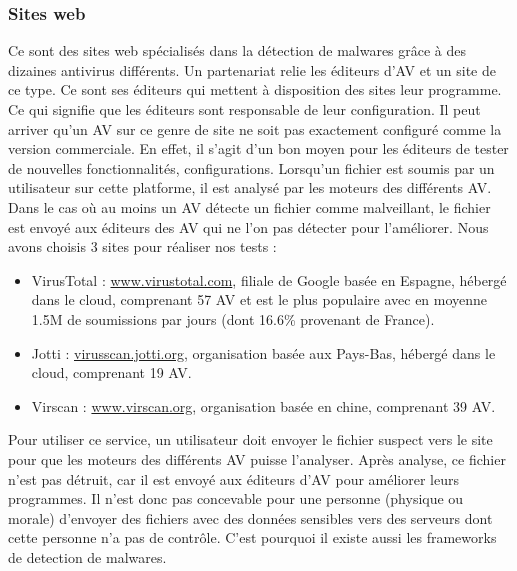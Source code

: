 \documentclass[smallextended]{svjour3}       %
\begin{document}
\subsubsection{Sites web}
\label{2.2.1sites}
Ce sont des sites web spécialisés dans la détection de malwares grâce à des dizaines antivirus différents. Un partenariat relie les éditeurs d'AV et un site de ce type. Ce sont ses éditeurs qui mettent à disposition des sites leur programme. Ce qui signifie que les éditeurs sont responsable de leur configuration. Il peut arriver qu'un AV sur ce genre de site ne soit pas exactement configuré comme la version commerciale. En effet, il s'agit d'un bon moyen pour les éditeurs de tester de nouvelles fonctionnalités, configurations. Lorsqu'un fichier est soumis par un utilisateur sur cette platforme, il est analysé par les moteurs des différents AV. Dans le cas où au moins un AV détecte un fichier comme malveillant, le fichier est envoyé aux éditeurs des AV qui ne l'on pas détecter pour l'améliorer. Nous avons choisis 3 sites pour réaliser nos tests :
\begin{itemize}
\item VirusTotal : \url{www.virustotal.com}, filiale de Google basée en Espagne, hébergé dans le cloud, comprenant 57 AV et est le plus populaire avec en moyenne 1.5M de soumissions par jours (dont 16.6\% provenant de France).
\item Jotti : \url{virusscan.jotti.org}, organisation basée aux Pays-Bas, hébergé dans le cloud, comprenant 19 AV.
\item Virscan : \url{www.virscan.org}, organisation basée en chine, comprenant 39 AV.
\end{itemize}

Pour utiliser ce service, un utilisateur doit envoyer le fichier suspect vers le site pour que les moteurs des différents AV puisse l'analyser. Après analyse, ce fichier n'est pas détruit, car il est envoyé aux éditeurs d'AV pour améliorer leurs programmes. Il n'est donc pas concevable pour une personne (physique ou morale) d'envoyer des fichiers avec des données sensibles vers des serveurs dont cette personne n'a pas de contrôle. C'est pourquoi il existe aussi les frameworks de detection de malwares.
\end{document}
